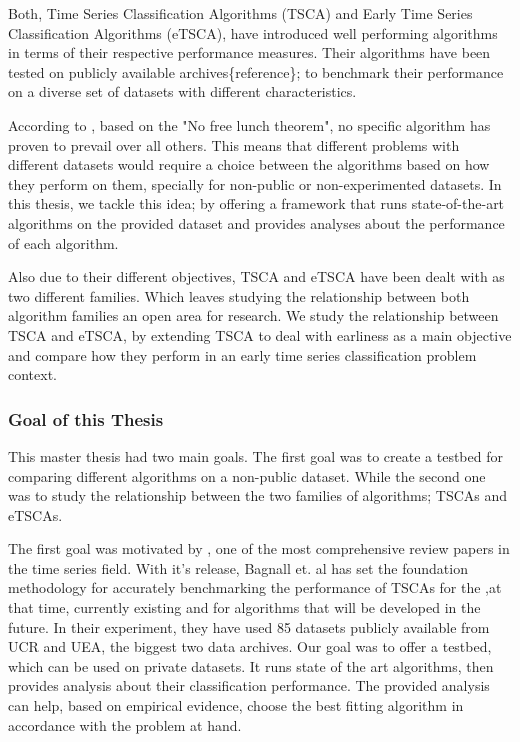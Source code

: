 Both, Time Series Classification Algorithms (TSCA) and Early Time Series Classification Algorithms (eTSCA), have introduced well performing algorithms in terms of their respective performance measures.
Their algorithms have been tested on publicly available archives\{reference\}; to benchmark their performance on a diverse set of datasets with different characteristics.

According to \cite{bagnall2017great}, based on the "No free lunch theorem", no specific algorithm has proven to prevail over all others. This means that different problems with different datasets would require a choice between the algorithms based on how they perform on them, specially for non-public or non-experimented datasets.
In this thesis, we tackle this idea; by offering a framework that runs state-of-the-art algorithms on the provided dataset and provides analyses about the performance of each algorithm.

Also due to their different objectives, TSCA and eTSCA have been dealt with as two different families. Which leaves studying the relationship between both algorithm families an open area for research.
We study the relationship between TSCA and eTSCA, by extending TSCA to deal with earliness as a main objective and compare how they perform in an early time series classification problem context.

\subsubsection*{Goal of this Thesis}
\label{thesisGoals}
This master thesis had two main goals.
The first goal was to create a testbed for comparing different algorithms on a non-public dataset.
While the second one was to study the relationship between the two families of algorithms; TSCAs and eTSCAs.

The first goal was motivated by \cite{bagnall2017great}, one of the most comprehensive review papers in the time series field.
With it's release, Bagnall et. al has set the foundation methodology for accurately benchmarking the performance of TSCAs for the ,at that time, currently existing and for algorithms that will be developed in the future.
In their experiment, they have used 85 datasets publicly available from UCR and UEA, the biggest two data archives.
Our goal was to offer a testbed, which can be used on private datasets. It runs state of the art algorithms, then provides analysis about their classification performance.
The provided analysis can help, based on empirical evidence, choose the best fitting algorithm in accordance with the problem at hand.


